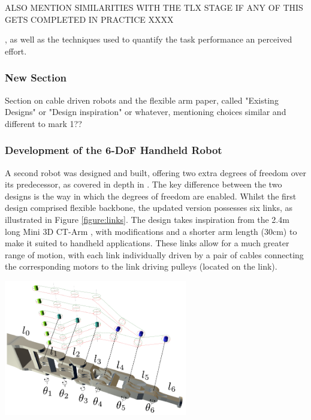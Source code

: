 \documentclass[11pt]{article}
\begin{document}
ALSO MENTION SIMILARITIES WITH THE TLX STAGE IF ANY OF THIS GETS COMPLETED IN PRACTICE XXXX

 , as well as the techniques used to quantify the task performance an perceived effort. 

\subsubsection{New Section}

Section on cable driven robots and the flexible arm paper, called "Existing Designs" or "Design inspiration" or whatever, mentioning choices similar and different to mark 1??

\subsubsection{Development of the 6-DoF Handheld Robot}

A second robot was designed and built, offering two extra degrees of freedom over its predecessor, as covered in depth in \cite{GreggSmithKinematics}. The key difference between the two designs is the way in which the degrees of freedom are enabled. Whilst the first design comprised flexible backbone, the updated version possesses six links, as illustrated in Figure \ref{figure:links}. The design takes inspiration from the 2.4m long Mini 3D CT-Arm \cite{Horigome2014}, with modifications and a shorter arm length (30cm) to make it suited to handheld applications. These links allow for a much greater range of motion, with each link individually driven by a pair of cables connecting the corresponding motors to the link driving pulleys (located on the link).

\begin{center}
\includegraphics[width = 0.6\textwidth]{links.png}
\label{figure:links}
\end{center}
\end{document}
